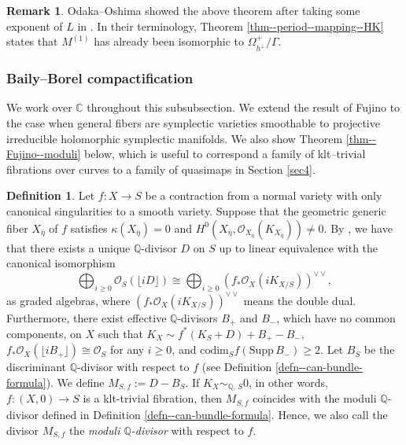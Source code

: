 \documentclass[12pt,twoside]{amsart}
\theoremstyle{definition}
\newtheorem{defn}[thm]{Definition}
\newtheorem{rem}[thm]{Remark}
\begin{document}
\begin{rem}
    Odaka--Oshima showed the above theorem after taking some exponent of $L$ in \cite[Theorem 8.3]{OO}.
    In their terminology, Theorem \ref{thm--period--mapping--HK} states that $M^{(1)}$ has already been isomorphic to $\Omega_{h^{\perp}}^+/\Gamma$.
\end{rem}

\subsubsection{Baily--Borel compactification}\label{subsec--baily--borel}
We work over $\mathbb{C}$ throughout this subsubsection. 
We extend the result of Fujino \cite{fujino--canonical-certain} to the case when general fibers are symplectic varieties smoothable to projective irreducible holomorphic symplectic manifolds. 
We also show Theorem \ref{thm--Fujino--moduli} below, which is useful to correspond a family of klt--trivial fibrations over curves to a family of quasimaps in Section \ref{sec4}.

\begin{defn}\label{defn--fujino--mori}
    Let $f\colon X\to S$ be a contraction from a normal variety with only canonical singularities to a smooth variety.
    Suppose that the geometric generic fiber $X_{\bar{\eta}}$ of $f$ satisfies $\kappa(X_{\bar{\eta}})=0$ and $H^0(X_{\bar{\eta}},\mathcal{O}_{X_{\bar{\eta}}}(K_{X_{\bar{\eta}}}))\ne0$.
By \cite[Proposition 2.2]{FM2}, we have that there exists a unique $\mathbb{Q}$-divisor $D$ on $S$ up to linear equivalence with the canonical  isomorphism
\[
\bigoplus_{i\ge0}\mathcal{O}_S(\lfloor iD\rfloor)\cong \bigoplus_{i\ge0}(f_*\mathcal{O}_X(iK_{X/S}))^{\vee\vee},
\]
as graded algebras, where $(f_*\mathcal{O}_X(iK_{X/S}))^{\vee\vee}$ means the double dual.
 Furthermore, there exist effective $\mathbb{Q}$-divisors $B_{+}$ and $B_{-}$, which have no common components, on $X$ such that
$
 K_X \sim f^*(K_S+D)+B_{+} - B_{-},
$
$f_*\mathcal{O}_X(\lfloor iB_+ \rfloor)\cong\mathcal{O}_S$ for any $i\ge0$, and $\mathrm{codim}_Sf(\mathrm{Supp}\, B_-)\geq 2$. 
Let $B_S$ be the discriminant $\mathbb{Q}$-divisor with respect to $f$ (see Definition \ref{defn--can-bundle-formula}).
 We define $M_{S,f}:=D-B_S$. 
 If $K_{X} \sim_{\mathbb{Q},\,S}0$, in other words, $f\colon (X,0)\to S$ is a klt-trivial fibration, then $M_{S,f}$ coincides with the moduli $\mathbb{Q}$-divisor defined in Definition \ref{defn--can-bundle-formula}. 
 Hence, we also call the divisor $M_{S,f}$ the {\em moduli $\mathbb{Q}$-divisor} with respect to $f$. 
\end{defn}
\end{document}
